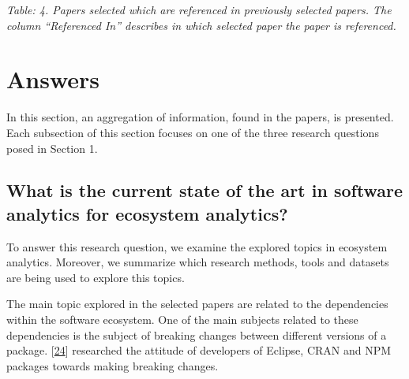 \documentclass[]{book}
\begin{document}
\emph{Table: 4. Papers selected which are referenced in previously
selected papers. The column ``Referenced In'' describes in which
selected paper the paper is referenced.}

\section{Answers}\label{answers-2}

In this section, an aggregation of information, found in the papers, is
presented. Each subsection of this section focuses on one of the three
research questions posed in Section 1.

\subsection{What is the current state of the art in software analytics
for ecosystem
analytics?}\label{what-is-the-current-state-of-the-art-in-software-analytics-for-ecosystem-analytics}

To answer this research question, we examine the explored topics in
ecosystem analytics. Moreover, we summarize which research methods,
tools and datasets are being used to explore this topics.

The main topic explored in the selected papers are related to the
dependencies within the software ecosystem. One of the main subjects
related to these dependencies is the subject of breaking changes between
different versions of a package.
{[}\protect\hyperlink{ref-Bogart2016}{24}{]} researched the attitude of
developers of Eclipse, CRAN and NPM packages towards making breaking
changes.
\end{document}

